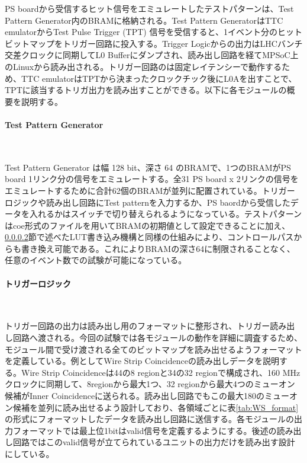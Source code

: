 PS boardから受信するヒット信号をエミュレートしたテストパターンは、Test Pattern Generator内のBRAMに格納される。Test Pattern GeneratorはTTC emulatorからTest Pulse Trigger (TPT) 信号を受信すると、1イベント分のヒットビットマップをトリガー回路に投入する。Trigger Logicからの出力はLHCバンチ交差クロックに同期してL0 Bufferにダンプされ、読み出し回路を経てMPSoC上のLinuxから読み出される。トリガー回路のは固定レイテンシーで動作するため、TTC emulatorはTPTから決まったクロックチック後にL0Aを出すことで、TPTに該当するトリガ出力を読み出すことができる。以下に各モジュールの概要を説明する。

\paragraph{Test Pattern Generator}　　
\par
Test Pattern Generator は幅 128 bit、深さ 64 のBRAMで、1つのBRAMがPS board 1リンク分の信号をエミュレートする。全31 PS board x 2リンクの信号をエミュレートするために合計62個のBRAMが並列に配置されている。トリガーロジックや読み出し回路にTest patternを入力するか、PS baordから受信したデータを入れるかはスイッチで切り替えられるようになっている。テストパターンはcoe形式のファイルを用いてBRAMの初期値として設定できることに加え、\ref{}節で述べたLUT書き込み機構と同様の仕組みにより、コントロールパスからも書き換え可能である。これによりBRAMの深さ64に制限されることなく、任意のイベント数での試験が可能になっている。

\paragraph{トリガーロジック}　　
\par
トリガー回路の出力は読み出し用のフォーマットに整形され、トリガー読み出し回路へ渡される。今回の試験では各モジュールの動作を詳細に調査するため、モジュール間で受け渡される全てのビットマップを読み出せるようフォーマットを定義している。例としてWire Strip Coincidenceの読み出しデータを説明する。Wire Strip Coincidenceは44の8 regionと34の32 regionで構成され、160 MHzクロックに同期して、8regionから最大1つ、32 regionから最大4つのミューオン候補がInner Coincidenceに送られる。読み出し回路でもこの最大180のミューオン候補を並列に読み出せるよう設計しており、各領域ごとに表\ref{tab:WS_format}の形式にフォーマットしたデータを読み出し回路に送信する。各モジュールの出力フォーマットでは最上位1bitはvalid信号を定義するようにする。後述の読み出し回路ではこのvalid信号が立てられているユニットの出力だけを読み出す設計にしている。

